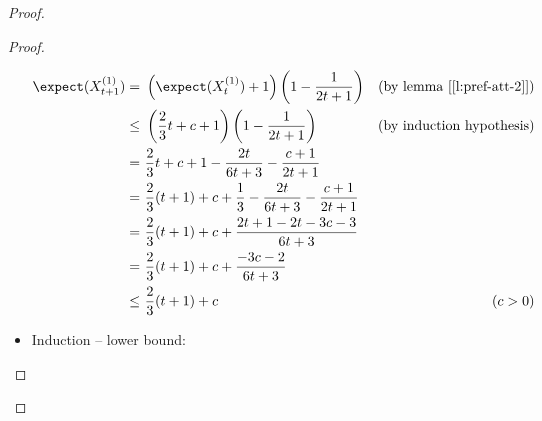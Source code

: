 \begin{proof}
\begin{proof}
\begin{itemize}
            \begin{align*}
                \expect(X_{t + 1}^{(1)}) =&\ \left( \expect(X_t^{(1)}) + 1 \right) \left( 1 - \frac{1}{2t + 1} \right)  & \text{(by lemma [\ref{l:pref-att-2}])}   \\
                \leq&\ \left( \frac{2}{3}t + c + 1 \right) \left( 1 - \frac{1}{2t + 1} \right)                          & \text{(by induction hypothesis)}         \\
                   =&\ \frac{2}{3}t + c + 1 - \frac{2t}{6t + 3} - \frac{c + 1}{2t + 1}                                  &                                       \\
                   =&\ \frac{2}{3} (t + 1) + c + \frac{1}{3} - \frac{2t}{6t + 3} - \frac{c + 1}{2t + 1}                 &                                       \\
                   =&\ \frac{2}{3} (t + 1) + c + \frac{2t + 1 - 2t - 3c - 3}{6t + 3}                                    &                                       \\
                   =&\ \frac{2}{3} (t + 1) + c + \frac{- 3c - 2}{6t + 3}                                                &                                       \\
                \leq&\ \frac{2}{3} (t + 1) + c                                                                          & (c > 0)                         \\
            \end{align*}

            \item Induction -- lower bound:


\end{itemize}
\end{proof}
\end{proof}
